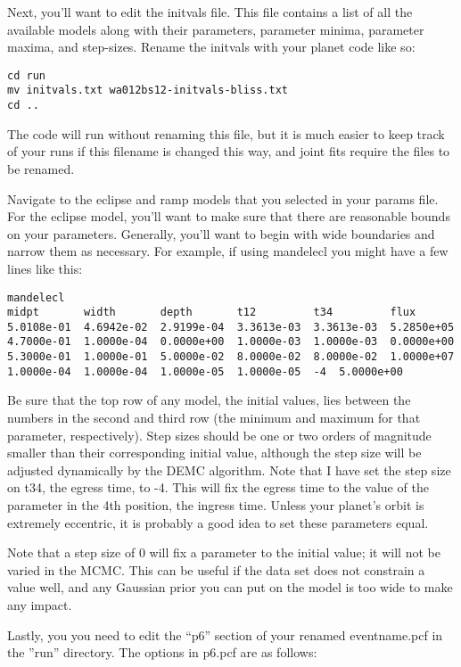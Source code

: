 \documentclass[letterpaper,12pt]{article}
\begin{document}
Next, you'll want to edit the initvals file. This file contains a list
of all the available models along with their parameters, parameter
minima, parameter maxima, and step-sizes. Rename the initvals with
your planet code like so:

\begin{verbatim}
cd run
mv initvals.txt wa012bs12-initvals-bliss.txt
cd ..
\end{verbatim}

The code will run without renaming this file, but it is much easier
to keep track of your runs if this filename is changed this way, and
joint fits require the files to be renamed.

Navigate to the eclipse and ramp models that you selected in your
params file. For the eclipse model, you'll want to make sure that
there are reasonable bounds on your parameters. Generally, you'll want
to begin with wide boundaries and narrow them as necessary. For
example, if using mandelecl you might have a few lines like this:

\begin{verbatim}
mandelecl
midpt     	width     	depth     	t12       	t34       	flux
5.0108e-01	4.6942e-02	2.9199e-04	3.3613e-03	3.3613e-03	5.2850e+05
4.7000e-01	1.0000e-04	0.0000e+00	1.0000e-03	1.0000e-03	0.0000e+00
5.3000e-01	1.0000e-01	5.0000e-02	8.0000e-02	8.0000e-02	1.0000e+07
1.0000e-04	1.0000e-04	1.0000e-05	1.0000e-05	-4	5.0000e+00
\end{verbatim}

Be sure that the top row of any model, the initial values, lies
between the numbers in the second and third row (the minimum and
maximum for that parameter, respectively). Step sizes should be one or
two orders of magnitude smaller than their corresponding initial
value, although the step size will be adjusted dynamically by the DEMC
algorithm. Note that I have set the step size on t34, the egress time,
to -4. This will fix the egress time to the value of the parameter in
the 4th position, the ingress time. Unless your planet's orbit is
extremely eccentric, it is probably a good idea to set these
parameters equal.

Note that a step size of 0 will fix a parameter to the initial value; it
will not be varied in the MCMC. This can be useful if the data set does
not constrain a value well, and any Gaussian prior you can put on the model
is too wide to make any impact.

Lastly, you you need to edit the ``p6'' section of your renamed
eventname.pcf in the ''run'' directory. The options in p6.pcf are as
follows:
\end{document}
